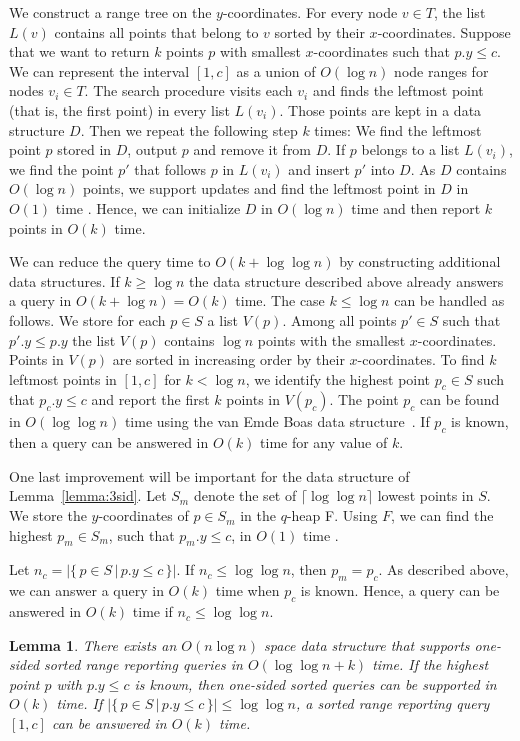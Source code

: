 \documentclass[11pt]{article}
\def\ceil#1{\lceil #1 \rceil}
\newcommand{\no}[1]{}
\newtheorem{lemma}{Lemma}
\begin{document}
We construct a range tree on the
$y$-coordinates. For every node $v\in T$, the list $L(v)$ contains all
points that belong to $v$ sorted by their $x$-coordinates. Suppose
that we want to return $k$ points $p$ with smallest $x$-coordinates
such that $p.y\leq c$.  We can represent the interval $[1,c]$ as a
union of $O(\log n)$ node ranges for nodes $v_i\in T$.  The search
procedure visits each $v_i$ and finds the leftmost point (that is, the
first point) in every list $L(v_i)$.  Those points are kept in a data
structure $D$. Then we repeat the following step $k$ times: We find the 
leftmost point $p$ stored in $D$, output $p$ and remove it from
$D$. If $p$ belongs to a list $L(v_i)$, we find the point $p'$ that
follows $p$ in $L(v_i)$ and insert $p'$ into $D$.  As $D$ contains
$O(\log n)$ points, we support updates and find the leftmost point
in $D$ in $O(1)$ time \cite{FW94}.  Hence, we can initialize $D$ in
$O(\log n)$ time and then report $k$ points in $O(k)$ time.


We can reduce the query time to $O(k+\log \log n)$ by constructing additional data
structures.  If $k\geq \log n$ the data structure described above
already answers a query in $O(k+\log n)=O(k)$ time.  The case $k\leq
\log n$ can be handled as follows.  We store for each $p\in S$ a list
$V(p)$. Among all points $p'\in S$ such that $p'.y\leq p.y$ the list
$V(p)$ contains $\log n$ points with the smallest
$x$-coordinates. Points in $V(p)$ are sorted in increasing order by
their $x$-coordinates.  To find $k$ leftmost points in $[1,c]$ for $k
<\log n$, we identify the highest point $p_c\in S$ such that $p_c.y \le
c$ and report the first $k$ points in $V(p_c)$. The point $p_c$ can be
found in $O(\log \log n)$ time using the van Emde Boas data structure~\cite{BoasKZ77}.  If $p_c$ is known, then a query can be answered in $O(k)$ time for any 
value of $k$.

One last improvement will be important for the data structure of Lemma~\ref{lemma:3sid}. Let $S_m$ denote the set of $\ceil{\log\log n}$ lowest points in $S$. We store the $y$-coordinates of $p\in S_m$
in the $q$-heap F. Using $F$, we can find the highest $p_m\in S_m$, 
such that $p_m.y\le c$, in $O(1)$ time \cite{FW94}. 
\no{Suppose that we want to report $k\ge \log \log n$ leftmost points $p\in S$, $p\leq a$, in sorted order.}   
Let $n_c=|\{\,p\in S\,|\,p.y\le c\,\}|$. If $n_c\le \log\log n$, 
then $p_m=p_c$. As described above, we can answer a query in $O(k)$ time 
when $p_c$ is known. Hence, a query can be answered in $O(k)$ time if $n_c\le \log \log n$.
\no{If $n_a>\log \log n$, then we can answer a query in $O(k+\log \log n)=O(k)$ time.} 
\begin{lemma}\label{lemma:1sid}
  There exists an $O(n\log n)$ space data structure that supports
  one-sided sorted range 
  reporting queries in $O(\log \log n + k)$ time. If the highest point
  $p$ with $p.y\le c$ is known, then one-sided sorted queries can be
  supported in $O(k)$ time. 
  If $|\{\,p\in S\,|\,p.y\le c\,\}|\le \log \log n$, a sorted range 
  reporting query $[1,c]$ can be answered in $O(k)$ time.
\no{If $k\geq \log \log n$, then  one-sided  sorted  queries  can be answered in $O(k)$ time.}
\no{ where $n_a=|\{\,p\in S\,|\,p.y\le c\,\}|$.}
\end{lemma}
\end{document}
